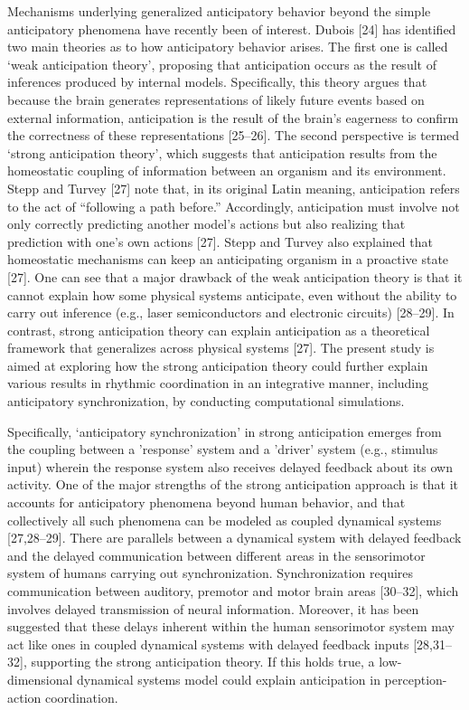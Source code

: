 \documentclass{report}
\begin{document}
Mechanisms underlying generalized anticipatory behavior beyond the simple anticipatory phenomena have recently been of interest. Dubois [24] has identified two main theories as to how anticipatory behavior arises. The first one is called ‘weak anticipation theory’, proposing that anticipation occurs as the result of inferences produced by internal models. Specifically, this theory argues that because the brain generates representations of likely future events based on external information, anticipation is the result of the brain’s eagerness to confirm the correctness of these representations [25–26]. The second perspective is termed ‘strong anticipation theory’, which suggests that anticipation results from the homeostatic coupling of information between an organism and its environment. Stepp and Turvey [27] note that, in its original Latin meaning, anticipation refers to the act of “following a path before.” Accordingly, anticipation must involve not only correctly predicting another model’s actions but also realizing that prediction with one’s own actions [27]. Stepp and Turvey also explained that homeostatic mechanisms can keep an anticipating organism in a proactive state [27]. One can see that a major drawback of the weak anticipation theory is that it cannot explain how some physical systems anticipate, even without the ability to carry out inference (e.g., laser semiconductors and electronic circuits) [28–29]. In contrast, strong anticipation theory can explain anticipation as a theoretical framework that generalizes across physical systems [27]. The present study is aimed at exploring how the strong anticipation theory could further explain various results in rhythmic coordination in an integrative manner, including anticipatory synchronization, by conducting computational simulations.

Specifically, ‘anticipatory synchronization’ in strong anticipation emerges from the coupling between a 'response' system and a 'driver' system (e.g., stimulus input) wherein the response system also receives delayed feedback about its own activity. One of the major strengths of the strong anticipation approach is that it accounts for anticipatory phenomena beyond human behavior, and that collectively all such phenomena can be modeled as coupled dynamical systems [27,28–29]. There are parallels between a dynamical system with delayed feedback and the delayed communication between different areas in the sensorimotor system of humans carrying out synchronization. Synchronization requires communication between auditory, premotor and motor brain areas [30–32], which involves delayed transmission of neural information. Moreover, it has been suggested that these delays inherent within the human sensorimotor system may act like ones in coupled dynamical systems with delayed feedback inputs [28,31–32], supporting the strong anticipation theory. If this holds true, a low-dimensional dynamical systems model could explain anticipation in perception-action coordination.
\end{document}
